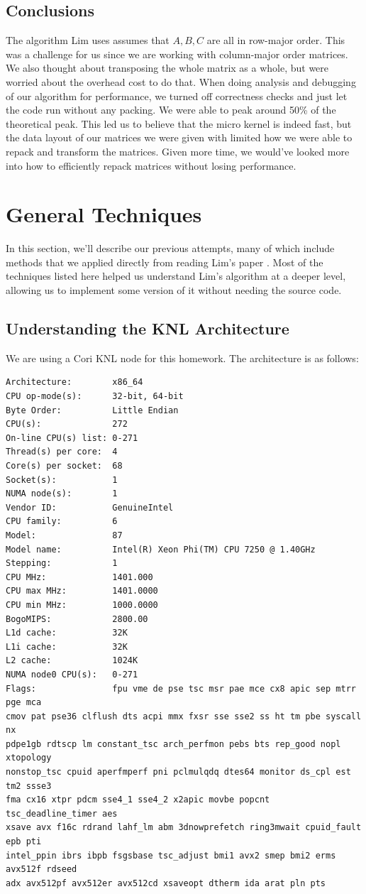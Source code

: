 \documentclass{article}
\begin{document}
\subsection{Conclusions}
The algorithm Lim uses assumes that $A, B ,C$ are all in row-major order. This was a challenge for us since we are working with column-major order matrices. We also thought about transposing the whole matrix as a whole, but were worried about the overhead cost to do that. When doing analysis and debugging of our algorithm for performance, we turned off correctness checks and just let the code run without any packing. We were able to peak around 50\% of the theoretical peak. This led us to believe that the micro kernel is indeed fast, but the data layout of our matrices we were given with limited how we were able to repack and transform the matrices. Given more time, we would've looked more into how to efficiently repack matrices without losing performance.

\section{General Techniques}
In this section, we'll describe our previous attempts, many of which include methods that we applied directly from reading Lim's paper \cite{10.1007/s10586-018-2810-y}. Most of the techniques listed here helped us understand Lim's algorithm at a deeper level, allowing us to implement some version of it without needing the source code.

\subsection{Understanding the KNL Architecture}
We are using a Cori KNL node for this homework. The architecture is as follows:
\begin{verbatim}
Architecture:        x86_64
CPU op-mode(s):      32-bit, 64-bit
Byte Order:          Little Endian
CPU(s):              272
On-line CPU(s) list: 0-271
Thread(s) per core:  4
Core(s) per socket:  68
Socket(s):           1
NUMA node(s):        1
Vendor ID:           GenuineIntel
CPU family:          6
Model:               87
Model name:          Intel(R) Xeon Phi(TM) CPU 7250 @ 1.40GHz
Stepping:            1
CPU MHz:             1401.000
CPU max MHz:         1401.0000
CPU min MHz:         1000.0000
BogoMIPS:            2800.00
L1d cache:           32K
L1i cache:           32K
L2 cache:            1024K
NUMA node0 CPU(s):   0-271
Flags:               fpu vme de pse tsc msr pae mce cx8 apic sep mtrr pge mca 
cmov pat pse36 clflush dts acpi mmx fxsr sse sse2 ss ht tm pbe syscall nx 
pdpe1gb rdtscp lm constant_tsc arch_perfmon pebs bts rep_good nopl xtopology
nonstop_tsc cpuid aperfmperf pni pclmulqdq dtes64 monitor ds_cpl est tm2 ssse3
fma cx16 xtpr pdcm sse4_1 sse4_2 x2apic movbe popcnt tsc_deadline_timer aes 
xsave avx f16c rdrand lahf_lm abm 3dnowprefetch ring3mwait cpuid_fault epb pti 
intel_ppin ibrs ibpb fsgsbase tsc_adjust bmi1 avx2 smep bmi2 erms avx512f rdseed 
adx avx512pf avx512er avx512cd xsaveopt dtherm ida arat pln pts
\end{verbatim}
\end{document}
